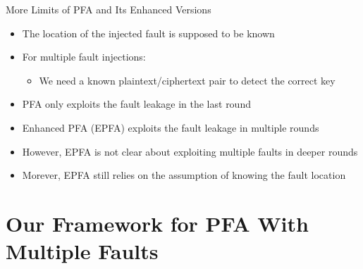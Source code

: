 \documentclass[table,aspectratio=169]{beamer}
\begin{document}
\begin{frame}{More Limits of PFA and Its Enhanced Versions}
\begin{itemize}
\item<1-> The \textcolor{tug}{location of the injected} fault is supposed to be known
\item<2-> For multiple fault injections:
\begin{itemize}
  \item We need a known plaintext/ciphertext pair to detect the correct key
\end{itemize}
\item<3-> PFA only exploits the fault leakage in the last round
\item<4-> Enhanced PFA (EPFA) \cite{tcad_XuZYZHR21} exploits the fault leakage in multiple rounds
\item<5-> However, EPFA is not clear about exploiting multiple faults in deeper rounds
\item<6-> Morever, EPFA still relies on the assumption of knowing the \textcolor{tug}{fault location}
\end{itemize}
\end{frame}

\section{Our Framework for PFA With Multiple Faults}

\end{document}
